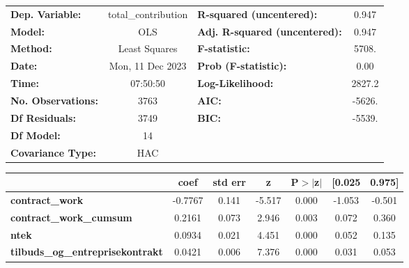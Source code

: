 \begin{center}
\begin{tabular}{lclc}
\toprule
\textbf{Dep. Variable:}                     & total\_contribution & \textbf{  R-squared (uncentered):}      &     0.947   \\
\textbf{Model:}                             &         OLS         & \textbf{  Adj. R-squared (uncentered):} &     0.947   \\
\textbf{Method:}                            &    Least Squares    & \textbf{  F-statistic:       }          &     5708.   \\
\textbf{Date:}                              &   Mon, 11 Dec 2023  & \textbf{  Prob (F-statistic):}          &     0.00    \\
\textbf{Time:}                              &       07:50:50      & \textbf{  Log-Likelihood:    }          &    2827.2   \\
\textbf{No. Observations:}                  &          3763       & \textbf{  AIC:               }          &    -5626.   \\
\textbf{Df Residuals:}                      &          3749       & \textbf{  BIC:               }          &    -5539.   \\
\textbf{Df Model:}                          &            14       & \textbf{                     }          &             \\
\textbf{Covariance Type:}                   &         HAC         & \textbf{                     }          &             \\
\bottomrule
\end{tabular}
\begin{tabular}{lcccccc}
                                            & \textbf{coef} & \textbf{std err} & \textbf{z} & \textbf{P$> |$z$|$} & \textbf{[0.025} & \textbf{0.975]}  \\
\midrule
\textbf{contract\_work}                     &      -0.7767  &        0.141     &    -5.517  &         0.000        &       -1.053    &       -0.501     \\
\textbf{contract\_work\_cumsum}             &       0.2161  &        0.073     &     2.946  &         0.003        &        0.072    &        0.360     \\
\textbf{ntek}                               &       0.0934  &        0.021     &     4.451  &         0.000        &        0.052    &        0.135     \\
\textbf{tilbuds\_og\_entreprisekontrakt}    &       0.0421  &        0.006     &     7.376  &         0.000        &        0.031    &        0.053     \\

\end{tabular}
\end{center}
